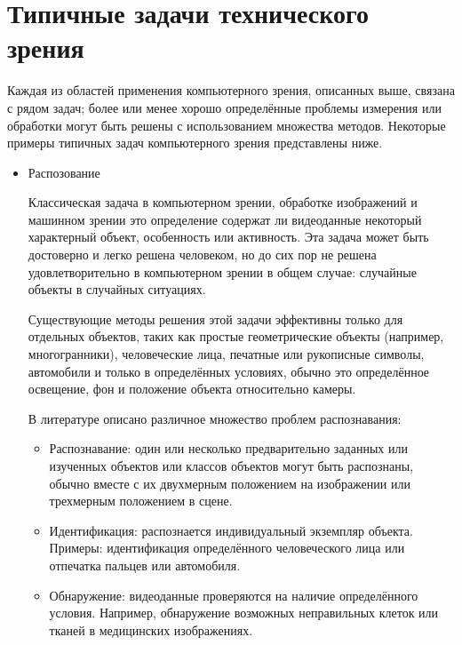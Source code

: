 \documentclass[a4paper,14pt]{extreport}
\begin{document}
\section{Типичные задачи технического зрения}

Каждая из областей применения компьютерного зрения, описанных выше, связана с рядом задач; более или менее хорошо определённые проблемы измерения или обработки могут быть решены с использованием множества методов. Некоторые примеры типичных задач компьютерного зрения представлены ниже.

\begin{itemize}
	\item Распозование
	
	Классическая задача в компьютерном зрении, обработке изображений и машинном зрении это определение содержат ли видеоданные некоторый характерный объект, особенность или активность. Эта задача может быть достоверно и легко решена человеком, но до сих пор не решена удовлетворительно в компьютерном зрении в общем случае: случайные объекты в случайных ситуациях.
	
	Существующие методы решения этой задачи эффективны только для отдельных объектов, таких как простые геометрические объекты (например, многогранники), человеческие лица, печатные или рукописные символы, автомобили и только в определённых условиях, обычно это определённое освещение, фон и положение объекта относительно камеры.
	
	В литературе описано различное множество проблем распознавания:
	\begin{itemize}
		\item Распознавание: один или несколько предварительно заданных или изученных объектов или классов объектов могут быть распознаны, обычно вместе с их двухмерным положением на изображении или трехмерным положением в сцене.
		
		\item Идентификация: распознается индивидуальный экземпляр объекта. Примеры: идентификация определённого человеческого лица или отпечатка пальцев или автомобиля.
		
		\item Обнаружение: видеоданные проверяются на наличие определённого условия. Например, обнаружение возможных неправильных клеток или тканей в медицинских изображениях. 
		

\end{itemize}
\end{itemize}
\end{document}
